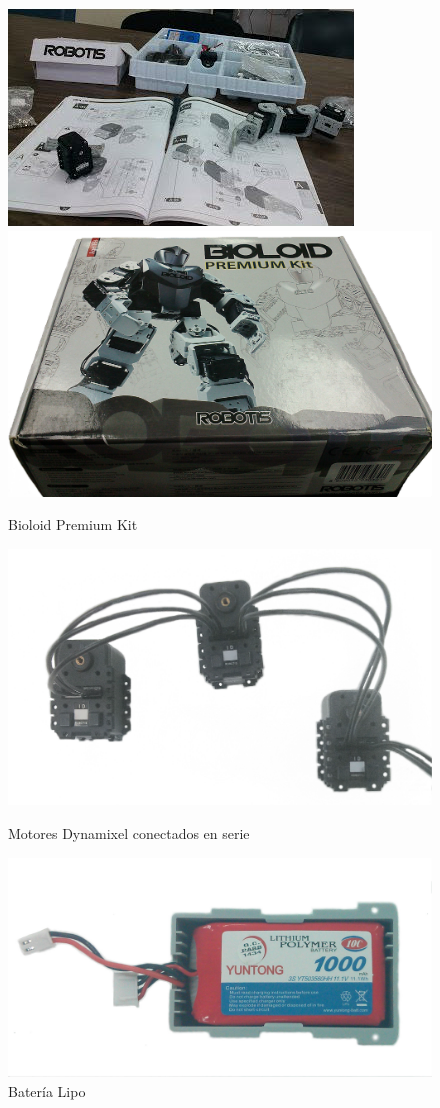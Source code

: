 \begin{figure}[hbtp]
\centering
\includegraphics[scale=0.5]{imagenes/kitAfuera.jpg}
\includegraphics[scale=0.07]{imagenes/cajaKit.jpg}
\caption{Bioloid Premium Kit}
\label{fig:kit}
\centering
\includegraphics[scale=0.1]{imagenes/3Dynamixel.jpg}
\caption{Motores Dynamixel conectados en serie}
\label{fig:motoresDc}
\centering
\includegraphics[scale=0.1]{imagenes/bateriaLipo.jpg}
\caption{Batería Lipo}
\label{bateria}
\end{figure}

